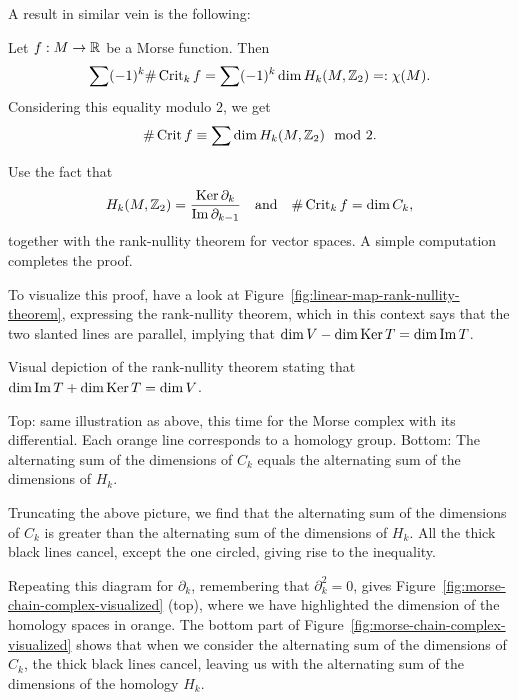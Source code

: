 A result in similar vein is the following:
\begin{theorem}
    Let $f: M \to  \mathbb{R}$ be a Morse function. Then
    \[
        \sum (-1)^{k} \# \operatorname{Crit}_k f = \sum (-1)^{k} \dim H_k(M, \mathbb{Z}_2)  =: \chi(M)
    .\]
    Considering this equality modulo $2$, we get
    \[
        \# \operatorname{Crit} f  \equiv \sum \dim H_k(M, \mathbb{Z}_2) \mod 2
    .\]
\end{theorem}
\begin{myproof}
    Use the fact that 
    \[
        H_k(M, \mathbb{Z}_2) = \frac{\operatorname{Ker} \partial_k}{\operatorname{Im} \partial_{k-1}} \quad \text{and} \quad \# \operatorname{Crit}_k f = \dim C_k,
    \]
    together with the rank-nullity theorem for vector spaces.
    A simple computation completes the proof.

    To visualize this proof, have a look at Figure~\ref{fig:linear-map-rank-nullity-theorem}, expressing the rank-nullity theorem, which in this context says that the two slanted lines are parallel, implying that $\dim V - \dim \operatorname{Ker} T = \dim \operatorname{Im} T$.
    \begin{marginfigure}
        \centering
        \caption{Visual depiction of the rank-nullity theorem stating that $\dim \operatorname{Im} T + \dim \operatorname{Ker} T = \dim V$.}
        \label{fig:linear-map-rank-nullity-theorem}
    \end{marginfigure}
    \begin{marginfigure}
        \centering
        \caption{
            Top: same illustration as above, this time for the Morse complex with its differential.
            Each orange line corresponds to a homology group.
            Bottom: The alternating sum of the dimensions of $C_k$ equals the alternating sum of the dimensions of $H_k$.
        }
        \label{fig:morse-chain-complex-visualized}
    \end{marginfigure}
    \begin{marginfigure}
        \centering
        \caption{Truncating the above picture, we find that the alternating sum of the dimensions of $C_k$ is greater than the alternating sum of the dimensions of  $H_k$. All the thick black lines cancel, except the one circled, giving rise to the inequality.
        }
        \label{fig:morse-chain-complex-visualized-truncated}
    \end{marginfigure}
    Repeating this diagram for $\partial_k$, remembering that  $\partial_k^2 = 0$, gives Figure~\ref{fig:morse-chain-complex-visualized} (top), where we have highlighted the dimension of the homology spaces in orange.
    The bottom part of Figure~\ref{fig:morse-chain-complex-visualized} shows that when we consider the alternating sum of the dimensions of $C_k$, the thick black lines cancel, leaving us with the alternating sum of the dimensions of the homology $H_k$.
    \end{myproof}

